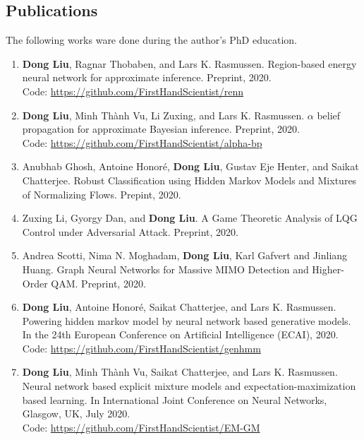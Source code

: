 \subsection{Publications}
The following works ware done during the author's PhD education.
\begin{enumerate}
\item \label{pub-renn} \textbf{Dong Liu}, Ragnar Thobaben, and Lars K. Rasmussen. Region-based energy neural network for approximate inference. Preprint, 2020. \\
  Code: \href{https://github.com/FirstHandScientist/renn}{https://github.com/FirstHandScientist/renn}
\item \label{pub-alphabp-convergence}\textbf{Dong Liu}, Minh Th\`{a}nh Vu, Li Zuxing, and Lars K. Rasmussen. $\alpha$ belief propagation for approximate Bayesian inference. Preprint, 2020.\\
  Code: \href{https://github.com/FirstHandScientist/alpha-bp}{https://github.com/FirstHandScientist/alpha-bp}

\item Anubhab Ghosh, Antoine Honor{\'e}, \textbf{Dong Liu}, Gustav Eje Henter, and Saikat Chatterjee. Robust Classification using Hidden Markov Models and Mixtures of Normalizing Flows. Prepint, 2020.

\item Zuxing Li, Gyorgy Dan, and \textbf{Dong Liu}. A Game Theoretic Analysis of LQG Control under Adversarial Attack. Preprint, 2020.

\item Andrea Scotti, Nima N. Moghadam, \textbf{Dong Liu}, Karl Gafvert and Jinliang Huang. Graph Neural Networks for Massive MIMO Detection and Higher-Order QAM. Preprint, 2020.
  
\item \label{pub-hmm-flow} \textbf{Dong Liu}, Antoine Honor{\'e}, Saikat Chatterjee, and Lars K. Rasmussen. Powering hidden
  markov model by neural network based generative models. In the 24th European Conference on Artificial Intelligence (ECAI), 2020.\\
  Code: \href{https://github.com/FirstHandScientist/genhmm}{https://github.com/FirstHandScientist/genhmm}

\item \label{pub-em-flow} \textbf{Dong Liu}, Minh Th\`{a}nh Vu, Saikat Chatterjee, and Lars K. Rasmussen. Neural network based explicit mixture models and expectation-maximization based learning. In International Joint Conference on Neural Networks, Glasgow, UK, July 2020. \\
  Code: \href{https://github.com/FirstHandScientist/EM-GM}{https://github.com/FirstHandScientist/EM-GM}


\end{enumerate}
